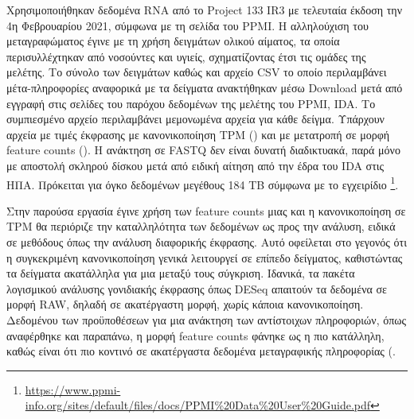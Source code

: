 \documentclass[12pt]{report}
\makeatletter
\let\oldchapter\chapter
\renewcommand{\chapter}{\@ifstar{\starchapter}{\nostarchapter}}
\newcommand{\starchapter}[1]{\oldchapter*{#1}\thispagestyle{mainstyle}}
\newcommand{\nostarchapter}[1]{\oldchapter{#1}\thispagestyle{mainstyle}}
\let\oldfootnote\footnote
\renewcommand{\footnote}[1]{\oldfootnote{\onehalfspacing #1}}
\makeatother
\begin{document}
    \chapter{Μέθοδοι}
    \par
        Χρησιμοποιήθηκαν δεδομένα RNA από το Project 133 IR3 με τελευταία έκδοση την 4η Φεβρουαρίου 2021, σύμφωνα με τη σελίδα του PPMI. Η αλληλούχιση του μεταγραφώματος έγινε με τη χρήση δειγμάτων ολικού αίματος, τα οποία περισυλλέχτηκαν από νοσούντες και υγιείς, σχηματίζοντας έτσι τις ομάδες της μελέτης. Το σύνολο των δειγμάτων καθώς και αρχείο CSV το οποίο περιλαμβάνει μέτα-πληροφορίες αναφορικά με τα δείγματα ανακτήθηκαν μέσω Download μετά από εγγραφή στις σελίδες του παρόχου δεδομένων της μελέτης του PPMI, IDA. Το συμπιεσμένο αρχείο περιλαμβάνει μεμονωμένα αρχεία για κάθε δείγμα. Υπάρχουν αρχεία με τιμές έκφρασης με κανονικοποίηση TPM (\emph{\cite{Zhao2021TPMRepository}}) και με μετατροπή σε μορφή feature counts (\emph{\cite{Liao2014FeatureCounts:Features}}). Η ανάκτηση σε FASTQ  δεν είναι δυνατή διαδικτυακά, παρά μόνο με αποστολή σκληρού δίσκου μετά από ειδική αίτηση από την έδρα του IDA στις ΗΠΑ. Πρόκειται για όγκο δεδομένων μεγέθους 184 TB σύμφωνα με το εγχειρίδιο \footnote{\url{https://www.ppmi-info.org/sites/default/files/docs/PPMI\%20Data\%20User\%20Guide.pdf}}.
    \par
        Στην παρούσα εργασία έγινε χρήση των feature counts μιας και η κανονικοποίηση σε TPM θα περιόριζε την καταλληλότητα των δεδομένων ως προς την ανάλυση, ειδικά σε μεθόδους όπως την ανάλυση διαφορικής έκφρασης. Αυτό οφείλεται στο γεγονός ότι η συγκεκριμένη κανονικοποίηση γενικά λειτουργεί σε επίπεδο δείγματος, καθιστώντας τα δείγματα ακατάλληλα για μια μεταξύ τους σύγκριση. Ιδανικά, τα πακέτα λογισμικού ανάλυσης γονιδιακής έκφρασης όπως DESeq απαιτούν τα δεδομένα σε μορφή RAW, δηλαδή σε ακατέργαστη μορφή, χωρίς κάποια κανονικοποίηση. Δεδομένου των προϋποθέσεων για μια ανάκτηση των αντίστοιχων πληροφοριών, όπως αναφέρθηκε και παραπάνω, η μορφή feature counts φάνηκε ως η πιο κατάλληλη, καθώς είναι ότι πιο κοντινό σε ακατέργαστα δεδομένα μεταγραφικής πληροφορίας (\emph{\cite{Liao2014FeatureCounts:Features}}.
        
\end{document}
